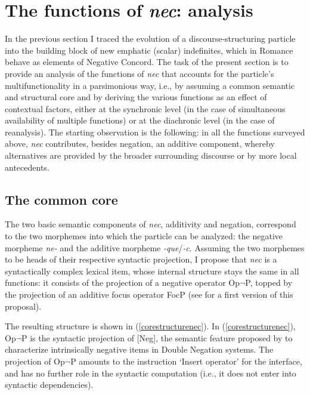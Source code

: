 \documentclass[output=paper,modfonts,nonflat,citecolor=brown,
showindex
]{langsci/langscibook}
\begin{document}
\section{The functions of {\emph{nec}}: analysis} \label{sectionanalysis}

In the previous section I traced the evolution of a discourse-structuring particle into the building block of new emphatic (scalar) indefinites, which in Romance behave as elements of Negative Concord. The task of the present section is to provide an analysis of the functions of {\emph{nec}} that accounts for the particle's multifunctionality in a parsimonious way, i.e., by assuming a common semantic and structural core and by deriving the various functions as an effect of contextual factors, either at the synchronic level (in the case of simultaneous availability of multiple functions) or at the diachronic level (in the case of reanalysis). The starting observation is the following: in all the functions surveyed above, {\emph{nec}} contributes, besides negation, an additive component, whereby alternatives are provided by the broader surrounding discourse or by more local antecedents.

\subsection{The common core}

The two basic semantic components of {\emph{nec}}, additivity and negation, correspond to the two morphemes into which the particle can be analyzed: the negative morpheme {\emph{ne-}} and the additive morpheme {\emph{-que}}/{\emph{-c}}. Assuming the two morphemes to be heads of their respective syntactic projection, I propose that {\emph{nec}} is a syntactically complex lexical item, whose internal structure stays the same in all functions: it consists of the projection of a negative operator Op$\lnot$P, topped by the projection of an additive focus operator FocP (see \citealt[]{Gianollo17} for a first version of this proposal).

The resulting structure is shown in (\ref{corestructurenec}). In (\ref{corestructurenec}), Op$\lnot$P is the syntactic projection of [Neg], the semantic feature proposed by \citet{Zeijlstra04, Zeijlstra14} to characterize intrinsically negative items in Double Negation systems. The projection of Op$\lnot$P amounts to the instruction `Insert operator' for the interface, and has no further role in the syntactic computation (i.e., it does not enter into syntactic dependencies).
\end{document}
